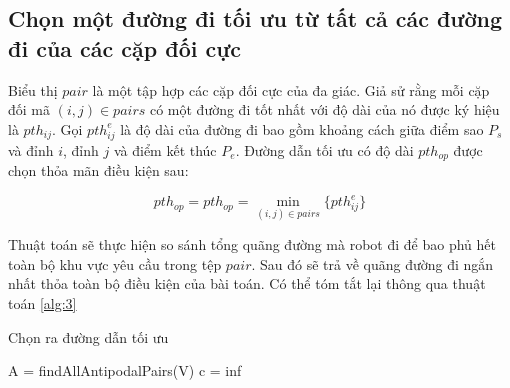 \subsection{Chọn một đường đi tối ưu từ tất cả các đường đi của các cặp đối cực}
Biểu thị $pair$ là một tập hợp các cặp đối cực của đa giác. Giả sử rằng mỗi cặp đối mã $(i,j)\in pairs$ có một đường đi tốt nhất với độ dài của nó được ký hiệu là $pth_{ij}$. Gọi $ pth_{ij}^e$ là độ dài của đường đi bao gồm khoảng cách giữa điểm sao $P_s$ và đỉnh $i$, đỉnh $j$ và điểm kết thúc $P_e$. Đường dẫn tối ưu có độ dài $pth_{op}$ được chọn thỏa mãn điều kiện sau:

    \begin{equation}
        pth_{op}=pth_{op}=\min_{(i,j)\in pairs}\{pth_{ij}^{e}\text{\}}
        \label{eq:optimalpath}
    \end{equation}

Thuật toán sẽ thực hiện so sánh tổng quãng đường mà robot đi để bao phủ hết toàn bộ khu vực yêu cầu
trong tệp $pair$. Sau đó sẽ trả về quãng đường đi ngắn nhất thỏa toàn bộ điều kiện của bài toán. Có thể tóm tắt lại thông qua thuật toán \ref{alg:3}

\begin{algorithm}
\caption{Chọn ra đường dẫn tối ưu}
\label{alg:3}
\SetAlgoLined
{}
A = findAllAntipodalPairs(V) \;
c = inf\;
\end{algorithm}